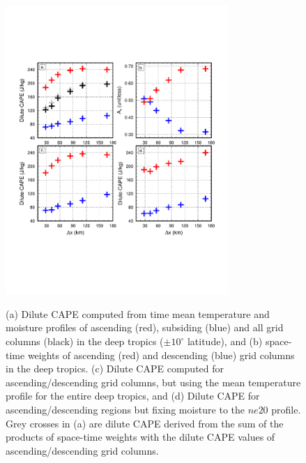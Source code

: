 \documentclass[times]{qjrms4}
\begin{document}
\begin{figure}
\begin{center}
\noindent\includegraphics[width=20pc,angle=0]{figs/temp_cape.pdf}\\
\end{center}
\caption{(a) Dilute CAPE computed from time mean temperature and moisture profiles of ascending (red), subsiding (blue) and all grid columns (black) in the deep tropics ($\pm 10^{\circ}$ latitude), and (b) space-time weights of ascending (red) and descending (blue) grid columns in the deep tropics. (c) Dilute CAPE computed for ascending/descending grid columns, but using the mean temperature profile for the entire deep tropics, and (d) Dilute CAPE for ascending/descending regions but fixing moisture to the $ne20$ profile. Grey crosses in (a) are dilute CAPE derived from the sum of the products of space-time weights with the dilute CAPE values of ascending/descending grid columns.}
\label{fig:cape}
\end{figure}
\end{document}

